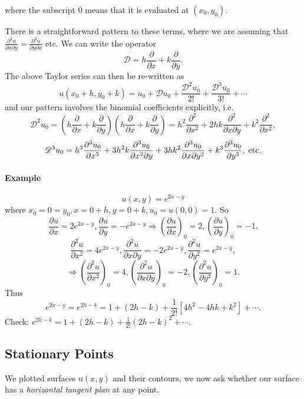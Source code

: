 \documentclass[12pt]{report}
\theoremstyle{definition}
\begin{document}
where the subscript $0$ means that it is evaluated at $(x_0, y_0)$.

\medskip
\noindent There is a straightforward pattern to these terms, where we are assuming
that $\frac{\partial^{2}u}{\partial x \partial y} = \frac{\partial^{2}u}{\partial y \partial x} $ etc.
We can write the operator \[
\mathscr{D} = h\frac{\partial}{\partial x} + k\frac{\partial}{\partial y}.
\] 
The above Taylor series can then be re-written as\[
    u(x_0 + h, y_0 + k) = u_0 + \mathscr{D}u_0 + \frac{\mathscr{D}^{2}u_0}{2!} + \frac{\mathscr{D}^{3}u_0}{3!} + \cdots
\]and our pattern involves the binomial coefficients explicitly, i.e.\ \[
\mathscr{D}^{2}u_0 =
\left(h\frac{\partial}{\partial x} + k\frac{\partial}{\partial y} \right)
\left(h\frac{\partial}{\partial x} + k\frac{\partial}{\partial y} \right) =
h^{2}\frac{\partial^{2}}{\partial x^{2}} +
2hk\frac{\partial^{2}}{\partial x\partial y} +
k^{2}\frac{\partial^{2}}{\partial x^{2}},
\]\[
    \mathscr{D}^{3}u_0 = h^{3}\frac{\partial^{3}u_0}{\partial x^{3}}
    + 3h^{2}k\frac{\partial^{3}u_0}{\partial x^{2} \partial y}
    + 3hk^{2}\frac{\partial^{3}u_0}{\partial x \partial y^{2}} 
    + k^{3}\frac{\partial^{3}u_0}{\partial y^{3}},\;\textnormal{etc.}
\]

\paragraph{Example}
\[
    u(x,y) = e^{2x-y}
\]
where $x_0 = 0 = y_0, x = 0 + h, y = 0 + k, u_0 = u(0,0) = 1$.
So\[
    \frac{\partial u}{\partial x} = 2e^{2x-y},
    \frac{\partial u}{\partial y} = -e^{2x-y}
    \Rightarrow{}{\left(\frac{\partial u}{\partial x} \right)}_0 = 2,
    {\left(\frac{\partial u}{\partial y} \right)}_0 = -1.
\]\[
    \frac{\partial^{2}u}{\partial x^{2}} = 4e^{2x-y},
    \frac{\partial^{2}u}{\partial x \partial y} = -2e^{2x-y},
    \frac{\partial^{2}u}{\partial y^{2}} = e^{2x-y},
\]\[
\Rightarrow{}{\left(\frac{\partial^{2}u}{\partial x^{2}} \right)}_{0} = 4,
{\left(\frac{\partial^{2}u}{\partial x \partial y} \right)}_{0} = -2,
{\left(\frac{\partial^{2}u}{\partial y^{2}} \right)}_{0} = 1.
\]
Thus \[
    e^{2x-y} = e^{2h-k} = 1 + (2h-k) + \frac{1}{2!}[4h^{2}-4hk+k^{2}] + \cdots.
\]
Check: $e^{2h-k} = 1 + (2h-k) + \frac{1}{2!}{(2h-k)}^{2} + \cdots$.

\subsection{Stationary Points}

We plotted surfaces $u(x,y)$ and their contours, we now ask whether our surface has
a \emph{horizontal tangent plan} at any point.
\end{document}
